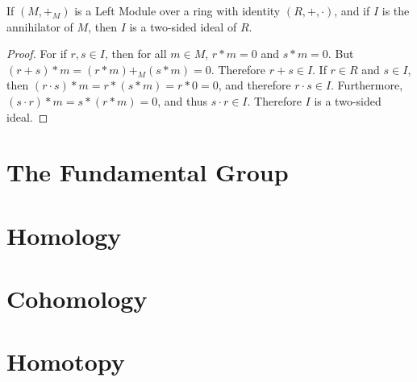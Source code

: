 \documentclass[crop=false,class=book,oneside]{standalone}
\begin{document}
        \begin{theorem}
            If $(M,+_{M})$ is a Left Module over a ring with
            identity $(R,+,\cdot)$, and if $I$ is the
            annihilator of $M$, then $I$ is a two-sided
            ideal of $R$.
        \end{theorem}
        \begin{proof}
            For if $r,s\in{I}$, then for all $m\in{M}$,
            $r*m=0$ and $s*m=0$. But $(r+s)*m=(r*m)+_{M}(s*m)=0$.
            Therefore $r+s\in{I}$. If $r\in{R}$ and $s\in{I}$,
            then $(r\cdot{s})*m=r*(s*m)=r*0=0$, and therefore
            $r\cdot{s}\in{I}$. Furthermore,
            $(s\cdot{r})*m=s*(r*m)=0$, and thus $s\cdot{r}\in{I}$.
            Therefore $I$ is a two-sided ideal.
        \end{proof}
    \section{The Fundamental Group}
    \section{Homology}
    \section{Cohomology}
    \section{Homotopy}
\end{document}
